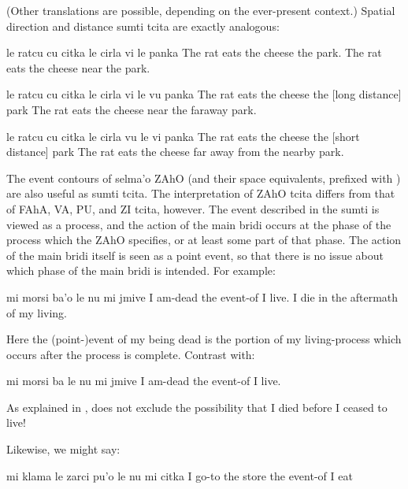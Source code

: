 (Other translations are possible, depending on the ever-present
    context.) Spatial direction and distance sumti tcita are
    exactly analogous:
\begin{example}
le ratcu cu citka le cirla vi le panka\n
The rat eats the cheese  the park.\n
The rat eats the cheese near the park.
\end{example}

\begin{example}
le ratcu cu citka le cirla\n
\T	vi le vu panka\n
The rat eats the cheese\n
\T	{} the [long distance] park\n
The rat eats the cheese near the faraway park.
\end{example}

\begin{example}
le ratcu cu citka le cirla\n
\T	vu le vi panka\n
The rat eats the cheese\n
\T	{} the [short distance] park\n
The rat eats the cheese far away from the nearby park.
\end{example}

The event contours of selma'o ZAhO (and their space
    equivalents, prefixed with ) are also useful as sumti
    tcita. The interpretation of ZAhO tcita differs from that of
    FAhA, VA, PU, and ZI tcita, however. The event described in the
    sumti is viewed as a process, and the action of the main bridi
    occurs at the phase of the process which the ZAhO specifies, or
    at least some part of that phase. The action of the main bridi
    itself is seen as a point event, so that there is no issue
    about which phase of the main bridi is intended. For example:
\begin{example}
mi morsi ba'o le nu mi jmive\n
I am-dead  the event-of I live.\n
I die in the aftermath of my living.
\end{example}

Here the (point-)event of my being dead is the portion of my
    living-process which occurs after the process is complete.
    Contrast  with:
\begin{example}
mi morsi ba le nu mi jmive\n
I am-dead  the event-of I live.
\end{example}

As explained in ,  does not exclude the possibility
    that I died before I ceased to live!

Likewise, we might say:
\begin{example}
mi klama le zarci pu'o le nu mi citka\n
I go-to the store  the event-of I eat
\end{example}

